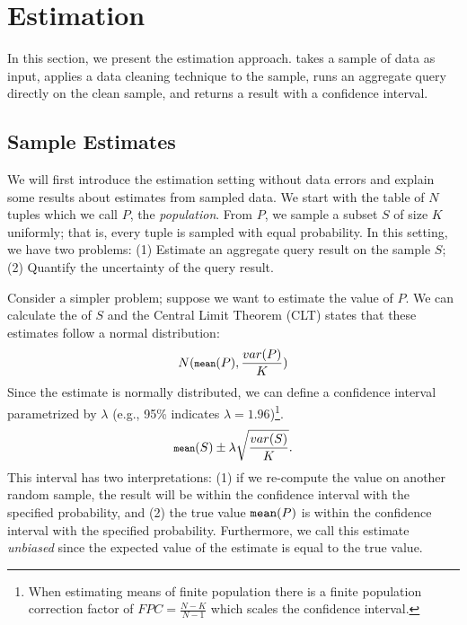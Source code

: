 
\section{\sampleclean Estimation}\label{sec:sampleclean}
In this section, we present the \sampleclean estimation approach.
\sampleclean takes a sample of data as input, applies a data cleaning technique to the sample, runs an aggregate query directly on the clean sample,
and returns a result with a confidence interval.

\subsection{Sample Estimates}\label{subsec:resultestimation}
We will first introduce the estimation setting without data errors and explain some results about estimates from sampled data.
We start with the table of $N$ tuples which we call $P$, the \emph{population}.
From $P$, we sample a subset $S$ of size $K$ uniformly; that is, every tuple is sampled with equal probability.
In this setting, we have two problems: (1) Estimate an aggregate query result on the sample $S$; (2) Quantify the uncertainty of the query result.

Consider a simpler problem; suppose we want to estimate the \mean value of $P$.
We can calculate the \mean of $S$ and the Central Limit Theorem (CLT) states that these estimates follow a normal distribution:
\begin{equation}\small
N(\mean(P),\frac{var(P)}{K})
\end{equation}
Since the estimate is normally distributed, we can define a confidence interval parametrized by $\lambda$ (e.g., 95\% indicates $\lambda=1.96$)\footnote{\scriptsize When estimating means of finite population there is a finite population correction factor of $FPC=\frac{N-K}{N-1}$ which scales the confidence interval.}.
\begin{equation}\small
\mean(S) \pm \lambda \sqrt{\frac{var(S)}{K}}.
\end{equation}
This interval has two interpretations: (1) if we re-compute the \mean value on another random sample, the result will be within the confidence interval with the specified probability, and (2)
the true value $\texttt{mean} (P)$ is within the confidence interval with the specified probability.
Furthermore, we call this estimate \emph{unbiased} since the expected value of the estimate is equal to the true value.

